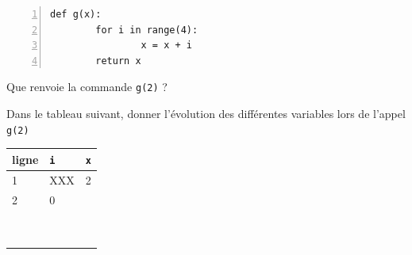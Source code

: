 \documentclass[a4paper,12pt,openany]{book}
\begin{document}
\begin{minipage}{9cm}
	\begin{lstlisting}[numbers=left]
def g(x):
		for i in range(4):
				x = x + i
		return x
\end{lstlisting}

\begin{liste}
	\item 	Que renvoie la commande \verb+g(2)+ ? \dotfill
	
	\dotfill
	\end{liste}\end{minipage}
\begin{minipage}{9cm}

\begin{liste}
	\item Dans le tableau suivant, donner l'évolution des différentes variables lors de l'appel \verb+g(2)+
	
\renewcommand{\arraystretch}{1.2}	
\begin{tabular}{|p{2cm}|p{2cm}|p{2cm}|}
\hline
ligne & \verb+i+ & \verb+x+  \\ \hline
1 & XXX & 2\\ \hline
2 & 0 & \\ \hline
& & \\ \hline
& & \\ \hline
& & \\ \hline
& & \\ \hline
& & \\ \hline
& & \\ \hline
& & \\ \hline
& & \\ \hline
& & \\ \hline

\end{tabular}	
	
\end{liste}\end{minipage}	






	
	\bigskip
	
\exo 
\end{document}
